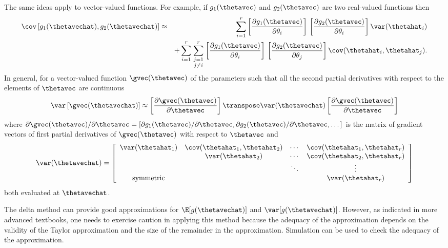 The same ideas apply to vector-valued functions. For example, if
$g_{1}(\thetavec)$ and $g_{2}(\thetavec)$ are two real-valued
functions then
\begin{eqnarray}
\cov \left[g_{1}(\thetavechat), g_{2}(\thetavechat)\right ]  
&\approx&
\sum_{i=1}^{r} 
         \left [
    \frac{\partial g_{1}(\thetavec)}
		    {\partial \theta_{i}}
	 \right ] \, 
	 \left [
     \frac{\partial g_{2}(\thetavec)} 
		    {\partial \theta_{i}} 
	 \right ] 
\var(\thetahat_{i}) 
\nonumber
\\
& &
	+ \sum_{i=1}^{r} 
	   \sum_
            {\textstyle {j=1 \atop j\ne i }}^{r} 
         \left [
    \frac{\partial g_{1}(\thetavec)}
		    {\partial \theta_{i}}
	 \right ] \, 
         \left [
     \frac{\partial g_{2}(\thetavec)}
		    {\partial \theta_{j}}
	 \right ] 
	 \cov(\thetahat_{i}, \thetahat_{j}).
\label{equation:covariance.approximation}
\end{eqnarray}
In general,
for a vector-valued 
function $\gvec(\thetavec)$ of the parameters such
that all the second partial derivatives
with respect to the elements of $\thetavec$ are continuous
\begin{displaymath}
 	\var \left [
             \gvec(\thetavechat)
             \right ] \approx
	\left [\frac{\partial \gvec(\thetavec)}{\partial \thetavec }
 	\right ] \transpose
 	\var(\thetavechat)
	\left [\frac{\partial \gvec(\thetavec)}{\partial \thetavec } \right ]
\end{displaymath}
where $\partial \gvec(\thetavec)/\partial \thetavec 
=[
\partial g_{1}(\thetavec)/\partial \thetavec, 
\partial g_{2}(\thetavec)/\partial \thetavec, \dots
]$ is the 
matrix of gradient vectors  
of first partial derivatives of $\gvec(\thetavec)$
with respect to $\thetavec$ and 
\begin{displaymath}
\var(\thetavechat)=
\left [
	\begin{array}{cccc}
\var(\thetahat_{1}) & \cov(\thetahat_{1},\thetahat_{2})& 
 \cdots &  \cov(\thetahat_{1},\thetahat_{r}) 
\\
&\var(\thetahat_{2}) &  \cdots &  \cov(\thetahat_{2},\thetahat_{r}) 
\\
& & \ddots & \vdots
\\
\mbox{symmetric} & & & \var(\thetahat_{r})
	 \end{array}
\right ]
\end{displaymath}
both evaluated at $\thetavechat$.

The delta method can provide 
good approximations for
$\E[g(\thetavechat)]$ and $\var[g(\thetavechat)]$.
However, as indicated in
more advanced textbooks, one needs to exercise caution in
applying this method because the adequacy of the approximation depends
on the validity of the Taylor approximation and the size of the
remainder in the approximation.
Simulation can be used to check the adequacy of the
approximation.

